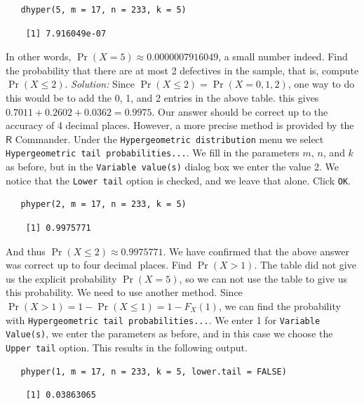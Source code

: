 \documentclass[captions=tableheading]{scrbook}
\begin{document}
\begin{example}
\begin{verbatim}
   dhyper(5, m = 17, n = 233, k = 5)
\end{verbatim}

\begin{verbatim}
    [1] 7.916049e-07
\end{verbatim}

   In other words, \(\Pr(X=5)\approx0.0000007916049\), a small number indeed.
Find the probability that there are at most 2 defectives in the sample, that is, compute \(\Pr(X\leq2)\).
   \emph{Solution:} Since \(\Pr(X\leq2)=\Pr(X=0,1,2)\), one way to do this would be to add the 0, 1, and 2 entries in the above table. this gives \(0.7011+0.2602+0.0362=0.9975\). Our answer should be correct up to the accuracy of 4 decimal places. However, a more precise method is provided by the \(\mathsf{R}\) Commander. Under the \texttt{Hypergeometric distribution} menu we select \texttt{Hypergeometric tail probabilities...}. We fill in the parameters \(m\), \(n\), and \(k\) as before, but in the \texttt{Variable value(s)} dialog box we enter the value 2. We notice that the \texttt{Lower tail} option is checked, and we leave that alone. Click \texttt{OK}.


\begin{verbatim}
   phyper(2, m = 17, n = 233, k = 5)
\end{verbatim}

\begin{verbatim}
    [1] 0.9975771
\end{verbatim}

   And thus \(\Pr(X\leq2)\approx 0.9975771\). We have confirmed that the above answer was correct up to four decimal places.
Find \(\Pr(X>1)\). 
   The table did not give us the explicit probability \(\Pr(X=5)\), so we can not use the table to give us this probability. We need to use another method. Since \(\Pr(X>1)=1-\Pr(X\leq1)=1-F_{X}(1)\), we can find the probability with \texttt{Hypergeometric tail probabilities...}. We enter 1 for \texttt{Variable Value(s)}, we enter the parameters as before, and in this case we choose the \texttt{Upper tail} option. This results in the following output.


\begin{verbatim}
   phyper(1, m = 17, n = 233, k = 5, lower.tail = FALSE)
\end{verbatim}

\begin{verbatim}
    [1] 0.03863065
\end{verbatim}


\end{example}
\end{document}
